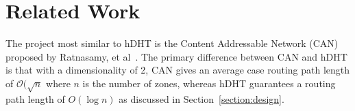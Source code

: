 \section{Related Work} \label{section:related-work}
The project most similar to hDHT is the Content Addressable Network (CAN) proposed by Ratnasamy, et al~\cite{ratnasamy2001scalable}. The primary difference between CAN and hDHT is that with a dimensionality of 2, CAN gives an average case routing path length of $\mathcal{O}(\sqrt n$ where $n$ is the number of zones, whereas hDHT guarantees a routing path length of $O(\log n)$ as discussed in Section~\ref{section:design}.